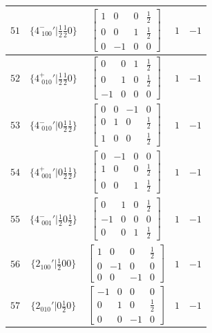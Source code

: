 \documentclass[fleqn,8pt]{jsarticle}
\begin{document}
\begin{longtable}{ccccc}
$ 51 $ & $ \{4^{-}_{\,\,100}{}'|\frac{1}{2} \frac{1}{2} 0\} $ & $ \begin{bmatrix} 1 & 0 & 0 & \frac{1}{2} \\ 0 & 0 & 1 & \frac{1}{2} \\ 0 & -1 & 0 & 0 \end{bmatrix} $ & $ 1 $ & $ -1 $ \\ \hline
$ 52 $ & $ \{4^{+}_{\,\,010}{}'|\frac{1}{2} \frac{1}{2} 0\} $ & $ \begin{bmatrix} 0 & 0 & 1 & \frac{1}{2} \\ 0 & 1 & 0 & \frac{1}{2} \\ -1 & 0 & 0 & 0 \end{bmatrix} $ & $ 1 $ & $ -1 $ \\ \hline
$ 53 $ & $ \{4^{-}_{\,\,010}{}'|0 \frac{1}{2} \frac{1}{2}\} $ & $ \begin{bmatrix} 0 & 0 & -1 & 0 \\ 0 & 1 & 0 & \frac{1}{2} \\ 1 & 0 & 0 & \frac{1}{2} \end{bmatrix} $ & $ 1 $ & $ -1 $ \\ \hline
$ 54 $ & $ \{4^{+}_{\,\,001}{}'|0 \frac{1}{2} \frac{1}{2}\} $ & $ \begin{bmatrix} 0 & -1 & 0 & 0 \\ 1 & 0 & 0 & \frac{1}{2} \\ 0 & 0 & 1 & \frac{1}{2} \end{bmatrix} $ & $ 1 $ & $ -1 $ \\ \hline
$ 55 $ & $ \{4^{-}_{\,\,001}{}'|\frac{1}{2} 0 \frac{1}{2}\} $ & $ \begin{bmatrix} 0 & 1 & 0 & \frac{1}{2} \\ -1 & 0 & 0 & 0 \\ 0 & 0 & 1 & \frac{1}{2} \end{bmatrix} $ & $ 1 $ & $ -1 $ \\ \hline
$ 56 $ & $ \{2{}_{100}{}'|\frac{1}{2} 0 0\} $ & $ \begin{bmatrix} 1 & 0 & 0 & \frac{1}{2} \\ 0 & -1 & 0 & 0 \\ 0 & 0 & -1 & 0 \end{bmatrix} $ & $ 1 $ & $ -1 $ \\ \hline
$ 57 $ & $ \{2{}_{010}{}'|0 \frac{1}{2} 0\} $ & $ \begin{bmatrix} -1 & 0 & 0 & 0 \\ 0 & 1 & 0 & \frac{1}{2} \\ 0 & 0 & -1 & 0 \end{bmatrix} $ & $ 1 $ & $ -1 $ \\ \hline

\end{longtable}
\end{document}
